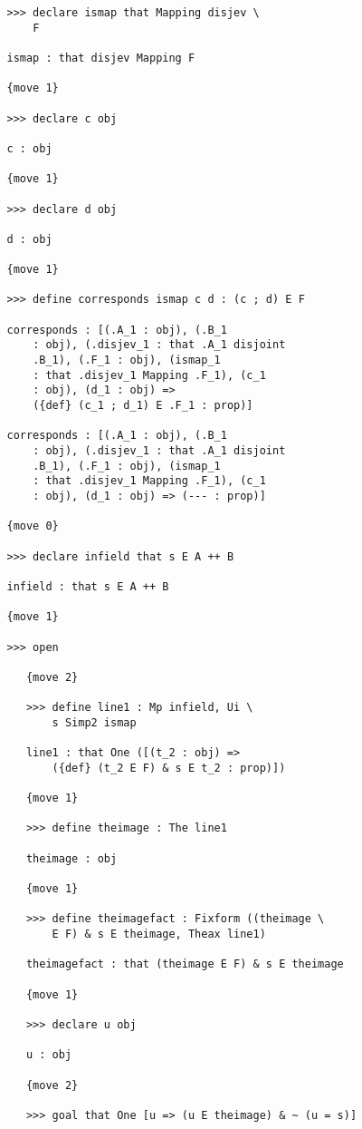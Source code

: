 \documentclass[12pt]{article}
\begin{document}
\begin{verbatim}
   >>> declare ismap that Mapping disjev \
       F

   ismap : that disjev Mapping F

   {move 1}

   >>> declare c obj

   c : obj

   {move 1}

   >>> declare d obj

   d : obj

   {move 1}

   >>> define corresponds ismap c d : (c ; d) E F

   corresponds : [(.A_1 : obj), (.B_1 
       : obj), (.disjev_1 : that .A_1 disjoint 
       .B_1), (.F_1 : obj), (ismap_1 
       : that .disjev_1 Mapping .F_1), (c_1 
       : obj), (d_1 : obj) => 
       ({def} (c_1 ; d_1) E .F_1 : prop)]

   corresponds : [(.A_1 : obj), (.B_1 
       : obj), (.disjev_1 : that .A_1 disjoint 
       .B_1), (.F_1 : obj), (ismap_1 
       : that .disjev_1 Mapping .F_1), (c_1 
       : obj), (d_1 : obj) => (--- : prop)]

   {move 0}

   >>> declare infield that s E A ++ B

   infield : that s E A ++ B

   {move 1}

   >>> open

      {move 2}

      >>> define line1 : Mp infield, Ui \
          s Simp2 ismap

      line1 : that One ([(t_2 : obj) => 
          ({def} (t_2 E F) & s E t_2 : prop)])

      {move 1}

      >>> define theimage : The line1

      theimage : obj

      {move 1}

      >>> define theimagefact : Fixform ((theimage \
          E F) & s E theimage, Theax line1)

      theimagefact : that (theimage E F) & s E theimage

      {move 1}

      >>> declare u obj

      u : obj

      {move 2}

      >>> goal that One [u => (u E theimage) & ~ (u = s)]


\end{verbatim}
\end{document}
